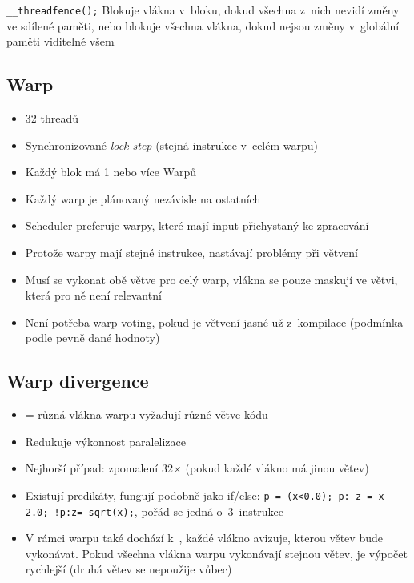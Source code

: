 \texttt{\_\_threadfence();} Blokuje vlákna v~bloku, dokud všechna z~nich nevidí změny ve sdílené paměti, nebo blokuje všechna vlákna, dokud nejsou změny v~globální paměti viditelné všem

\subsection{Warp}
\begin{itemize}
    \item 32 threadů
    \item Synchronizované \textit{lock-step} (stejná instrukce v~celém warpu)
    \item Každý blok má 1 nebo více Warpů
    \item Každý warp je plánovaný nezávisle na ostatních
    \item Scheduler preferuje warpy, které mají input přichystaný ke zpracování
    \item Protože warpy mají stejné instrukce, nastávají problémy při větvení
    \item Musí se vykonat obě větve pro celý warp, vlákna se pouze maskují ve větvi, která pro ně není relevantní
    \item Není potřeba warp voting, pokud je větvení jasné už z~kompilace (podmínka podle pevně dané hodnoty)
\end{itemize}

\subsection{Warp divergence}
\begin{itemize}
    \item = různá vlákna warpu vyžadují různé větve kódu
    \item Redukuje výkonnost paralelizace
    \item Nejhorší případ: zpomalení 32\(\times\) (pokud každé vlákno má jinou větev)
    \item Existují predikáty, fungují podobně jako if/else: \texttt{p = (x<0.0); p: z = x-2.0; !p:z= sqrt(x);}, pořád se jedná o~3~instrukce
    \item V rámci warpu také dochází k~, každé vlákno avizuje, kterou větev bude vykonávat. Pokud všechna vlákna warpu vykonávají stejnou větev, je výpočet rychlejší (druhá větev se nepoužije vůbec)
\end{itemize}


